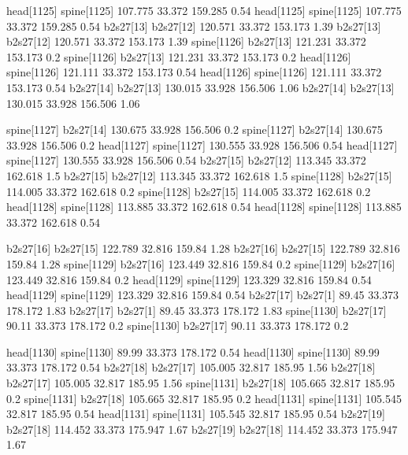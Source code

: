 head[1125]    spine[1125]    107.775    33.372    159.285    0.54
head[1125]    spine[1125]    107.775    33.372    159.285    0.54
b2s27[13]    b2s27[12]    120.571    33.372    153.173    1.39
b2s27[13]    b2s27[12]    120.571    33.372    153.173    1.39
spine[1126]    b2s27[13]    121.231    33.372    153.173    0.2
spine[1126]    b2s27[13]    121.231    33.372    153.173    0.2
head[1126]    spine[1126]    121.111    33.372    153.173    0.54
head[1126]    spine[1126]    121.111    33.372    153.173    0.54
b2s27[14]    b2s27[13]    130.015    33.928    156.506    1.06
b2s27[14]    b2s27[13]    130.015    33.928    156.506    1.06


spine[1127]    b2s27[14]    130.675    33.928    156.506    0.2
spine[1127]    b2s27[14]    130.675    33.928    156.506    0.2
head[1127]    spine[1127]    130.555    33.928    156.506    0.54
head[1127]    spine[1127]    130.555    33.928    156.506    0.54
b2s27[15]    b2s27[12]    113.345    33.372    162.618    1.5
b2s27[15]    b2s27[12]    113.345    33.372    162.618    1.5
spine[1128]    b2s27[15]    114.005    33.372    162.618    0.2
spine[1128]    b2s27[15]    114.005    33.372    162.618    0.2
head[1128]    spine[1128]    113.885    33.372    162.618    0.54
head[1128]    spine[1128]    113.885    33.372    162.618    0.54


b2s27[16]    b2s27[15]    122.789    32.816    159.84    1.28
b2s27[16]    b2s27[15]    122.789    32.816    159.84    1.28
spine[1129]    b2s27[16]    123.449    32.816    159.84    0.2
spine[1129]    b2s27[16]    123.449    32.816    159.84    0.2
head[1129]    spine[1129]    123.329    32.816    159.84    0.54
head[1129]    spine[1129]    123.329    32.816    159.84    0.54
b2s27[17]    b2s27[1]    89.45    33.373    178.172    1.83
b2s27[17]    b2s27[1]    89.45    33.373    178.172    1.83
spine[1130]    b2s27[17]    90.11    33.373    178.172    0.2
spine[1130]    b2s27[17]    90.11    33.373    178.172    0.2


head[1130]    spine[1130]    89.99    33.373    178.172    0.54
head[1130]    spine[1130]    89.99    33.373    178.172    0.54
b2s27[18]    b2s27[17]    105.005    32.817    185.95    1.56
b2s27[18]    b2s27[17]    105.005    32.817    185.95    1.56
spine[1131]    b2s27[18]    105.665    32.817    185.95    0.2
spine[1131]    b2s27[18]    105.665    32.817    185.95    0.2
head[1131]    spine[1131]    105.545    32.817    185.95    0.54
head[1131]    spine[1131]    105.545    32.817    185.95    0.54
b2s27[19]    b2s27[18]    114.452    33.373    175.947    1.67
b2s27[19]    b2s27[18]    114.452    33.373    175.947    1.67


